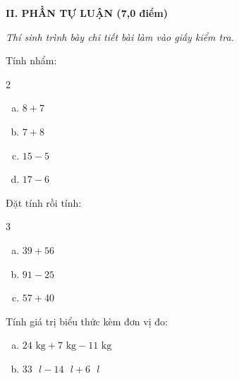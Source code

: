 \vspace{4mm}
\textbf{\large II. PHẦN TỰ LUẬN (7,0 điểm)}

{\itshape Thí sinh trình bày chi tiết bài làm vào giấy kiểm tra.}

\begin{bt}[1,0 điểm]
Tính nhẩm:
\begin{multicols}{2}
\begin{enumerate}[a)]
  \item $8 + 7$
  \item $7 + 8$
  \item $15 - 5$
  \item $17 - 6$
\end{enumerate}
\end{multicols}
\end{bt}

\begin{bt}[1,5 điểm]
Đặt tính rồi tính:
\begin{multicols}{3}
\begin{enumerate}[a)]
  \item $39 + 56$
  \item $91 - 25$
  \item $57 + 40$
\end{enumerate}
\end{multicols}
\end{bt}

\begin{bt}[1,0 điểm]
Tính giá trị biểu thức kèm đơn vị đo:
\begin{enumerate}[a)]
  \item $24\text{ kg} + 7\text{ kg} - 11\text{ kg}$
  \item $33\text{ }l - 14\text{ }l + 6\text{ }l$
\end{enumerate}
\end{bt}

